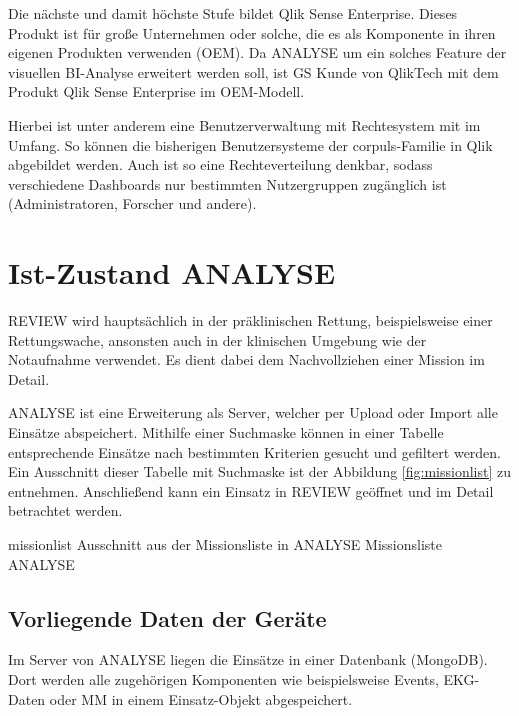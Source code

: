 Die nächste und damit höchste Stufe bildet Qlik Sense Enterprise.
Dieses Produkt ist für große Unternehmen oder solche, die es als Komponente in ihren eigenen Produkten verwenden (\gls{OEM}).
Da \gls{ANALYSE} um ein solches Feature der visuellen \gls{BI}-Analyse erweitert werden soll, ist \gls{GS} Kunde von QlikTech mit dem Produkt Qlik Sense Enterprise im \gls{OEM}-Modell.

Hierbei ist unter anderem eine Benutzerverwaltung mit Rechtesystem mit im Umfang.
So können die bisherigen Benutzersysteme der  \textsf{corpuls\color{corpulsred}{.web}}-Familie in Qlik abgebildet werden.
Auch ist so eine Rechteverteilung denkbar, sodass verschiedene Dashboards nur bestimmten Nutzergruppen zugänglich ist (Administratoren, Forscher und andere).


\section{Ist-Zustand \acrlong*{ANALYSE}}
\label{sec:istAnalyse}
\gls{REVIEW} wird hauptsächlich in der präklinischen Rettung, beispielsweise einer Rettungswache, ansonsten auch in der klinischen Umgebung wie der Notaufnahme verwendet.
Es dient dabei dem Nachvollziehen einer Mission im Detail.

\gls{ANALYSE} ist eine Erweiterung als Server, welcher per Upload oder Import alle Einsätze abspeichert. 
Mithilfe einer Suchmaske können in einer Tabelle entsprechende Einsätze nach bestimmten Kriterien gesucht und gefiltert werden.
Ein Ausschnitt dieser Tabelle mit Suchmaske ist der Abbildung \ref{fig:missionlist} zu entnehmen.
Anschließend kann ein Einsatz in \gls{REVIEW} geöffnet und im Detail betrachtet werden.

\bildbreit
{missionlist}
{Ausschnitt aus der \glqq Missionsliste\grqq{} in \gls{ANALYSE}}
{Missionsliste \gls{ANALYSE}}


\subsection{Vorliegende Daten der Geräte}
Im Server von \gls{ANALYSE} liegen die Einsätze in einer Datenbank (MongoDB).
Dort werden alle zugehörigen Komponenten wie beispielsweise Events, \gls{EKG}-Daten oder \gls{MM} in einem Einsatz-Objekt abgespeichert.

